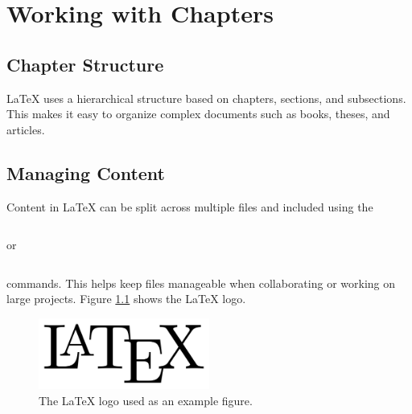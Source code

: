 \chapter{Working with Chapters}

\section{Chapter Structure}
LaTeX uses a hierarchical structure based on chapters, sections, and subsections. This makes it easy to organize complex documents such as books, theses, and articles.

\section{Managing Content}
Content in LaTeX can be split across multiple files and included using the

\begin{verbatim}\end{verbatim}
or
\begin{verbatim}\end{verbatim}

commands. This helps keep files manageable when collaborating or working on large projects. Figure \ref{fig:latex-logo} shows the LaTeX logo.

\begin{figure}[h]
    \centering
    \includegraphics[width=0.5\textwidth]{figs/logo.png}
    \caption{The LaTeX logo used as an example figure.}
    \label{fig:latex-logo}
\end{figure}

